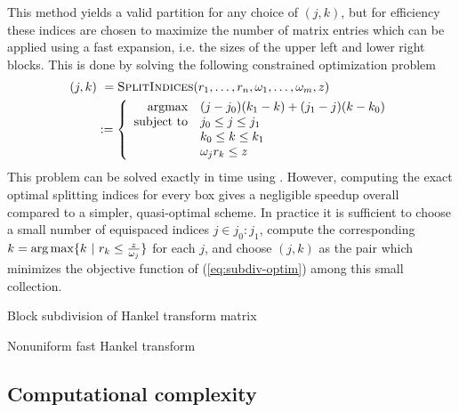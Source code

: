 This method yields a valid partition for any choice of $(j,k)$, but for
efficiency these indices are chosen to maximize the number of matrix entries
which can be applied using a fast expansion, i.e. the sizes of the upper left
and lower right blocks. This is done by solving the following constrained
optimization problem
\begin{align}
    (j,k) 
    &\ = \textsc{SplitIndices}(r_1,\dots,r_n, \omega_1,\dots,\omega_m, z) \\
    &:= \left\{
        \begin{array}{r@{\quad } l}
        \text{argmax} & (j-j_0)(k_1-k) + (j_1-j)(k-k_0)   \\
        \text{subject to} & j_0 \leq j \leq j_1 \\ 
        & k_0 \leq k \leq k_1 \\ 
        & \omega_j r_k \leq z
        \end{array}
    \right. \label{eq:subdiv-optim}
\end{align}
This problem can be solved exactly in  time
using . However, computing the exact optimal splitting indices
for every box gives a negligible speedup overall compared to a simpler,
quasi-optimal scheme. In practice it is sufficient to choose a small number of
equispaced indices $j \in j_0:j_1$, compute the corresponding $k = \operatorname*{arg\,max} \{k \
| \ r_k \leq \frac{z}{\omega_j}\}$ for each $j$, and choose $(j,k)$ as the pair
which minimizes the objective function of (\ref{eq:subdiv-optim}) among this
small collection.

\begin{algorithm2e}[t]
    \caption{Block subdivision of Hankel transform
    matrix}\label{alg:subdivision}
    
\end{algorithm2e}

\begin{algorithm2e}[t]
    \caption{Nonuniform fast Hankel transform}\label{alg:nufht}
    
\end{algorithm2e}

\subsection{Computational complexity}

